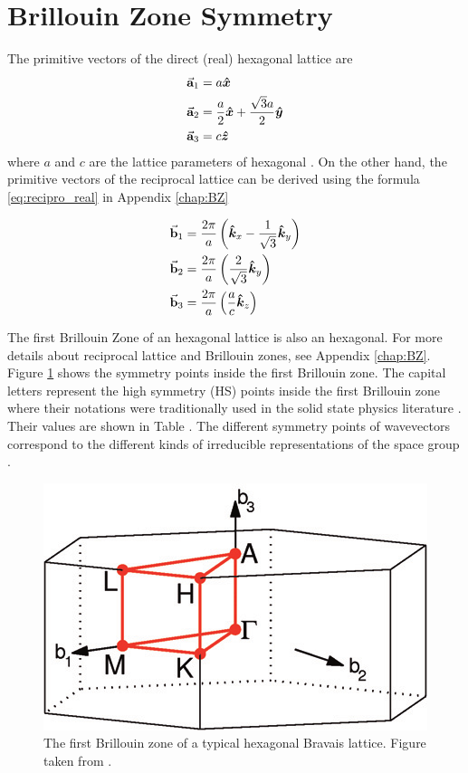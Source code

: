 \section{Brillouin Zone Symmetry}
	The primitive vectors of the direct (real) hexagonal lattice are 
\begin{align}
	\va{a}_1 &= a \vu*{x}	\\
	\va{a}_2 &= \frac{a}{2} \vu*{x} + \frac{\sqrt{3}a}{2} \vu*{y} \\
	\va{a}_3 &= c \vu*{z}
\end{align}
where $a$ and $c$ are the lattice parameters of hexagonal . On the other hand, the primitive vectors of the reciprocal lattice can be derived using the formula \eqref{eq:recipro_real} in Appendix \ref{chap:BZ} 

\begin{align}
	\va{b}_1 &= \frac{2 \pi}{a} \left(\vu*{k}_x - \frac{1}{\sqrt{3}} \vu*{k}_y \right) \\ 
	\va{b}_2 &= \frac{2 \pi}{a} \left( \frac{2}{\sqrt{3}} \vu*{k}_y \right) \\
	\va{b}_3 &= \frac{2 \pi}{a} \left( \frac{a}{c} \vu*{k}_z  \right)
\end{align}

The first Brillouin Zone of an hexagonal lattice is also an hexagonal. For more details about reciprocal lattice and Brillouin zones, see Appendix \ref{chap:BZ}.  Figure \ref{fig:HS} shows the symmetry points inside the first Brillouin zone. The capital letters represent the high symmetry (HS) points inside the first Brillouin zone where their notations were traditionally used in the solid state physics literature \citep{Bouckaert1936}. Their  values are shown in Table .  The different symmetry points of wavevectors correspond to the different kinds of irreducible representations of the space group \citep{Shmueli2001,Aroyo2006,PerezMato2011,Aroyo2014}. 

\begin{figure}[tbh!] 
	\centering
	\includegraphics[width=0.48\linewidth]{"images/rrl/hex"}
	\caption[The first Brillouin zone of a typical hexagonal Bravais lattice]{The first Brillouin zone of a typical hexagonal Bravais lattice. Figure taken from \citep{Setyawan2010}.}
	\label{fig:HS}
\end{figure}


